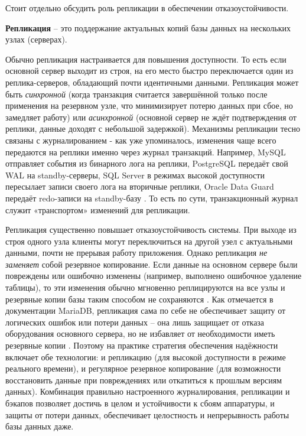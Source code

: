  Стоит отдельно обсудить роль репликации в обеспечении отказоустойчивости. 
 \begin{grayquote}
    \textbf{Репликация} – это поддержание актуальных копий базы данных на нескольких узлах (серверах). 
 \end{grayquote}
 
 Обычно репликация настраивается для повышения доступности. То есть если основной сервер выходит из строя, на его место быстро переключается один из реплика-серверов, обладающий почти идентичными данными. Репликация может быть \textit{синхронной} (когда транзакция считается завершённой только после применения на резервном узле, что минимизирует потерю данных при сбое, но замедляет работу) или \textit{асинхронной} (основной сервер не ждёт подтверждения от реплики, данные доходят с небольшой задержкой). Механизмы репликации тесно связаны с журналированием - как уже упоминалось, изменения чаще всего передаются на реплики именно через журнал транзакций. Например, MySQL отправляет события из бинарного лога на реплики, PostgreSQL передаёт свой WAL на standby-серверы, SQL Server в режимах высокой доступности пересылает записи своего лога на вторичные реплики, Oracle Data Guard передаёт redo-записи на standby-базу \autocites{Mysqldoc7}{MicrosoftLearnSQLserverTransLog}. То есть по сути, транзакционный журнал служит «транспортом» изменений для репликации. 
 
 Репликация существенно повышает отказоустойчивость системы. При выходе из строя одного узла клиенты могут переключиться на другой узел с актуальными данными, почти не прерывая работу приложения. Однако репликация \textit{не заменяет} собой резервное копирование. Если данные на основном сервере были повреждены или ошибочно изменены (например, выполнено ошибочное удаление таблицы), то эти изменения обычно мгновенно реплицируются на все узлы и резервные копии базы таким способом не сохраняются \autocite{mariaBackup}. Как отмечается в документации MariaDB, репликация сама по себе не обеспечивает защиту от логических ошибок или потери данных – она лишь защищает от отказа оборудования основного сервера, но не избавляет от необходимости иметь резервные копии \autocite{mariaBackup}. Поэтому на практике стратегия обеспечения надёжности включает обе технологии: и репликацию (для высокой доступности в режиме реального времени), и регулярное резервное копирование (для возможности восстановить данные при повреждениях или откатиться к прошлым версиям данных). Комбинация правильно настроенного журналирования, репликации и бэкапов позволяет достичь в целом и устойчивости к сбоям аппаратуры, и защиты от потери данных, обеспечивает целостность и непрерывность работы базы данных даже.